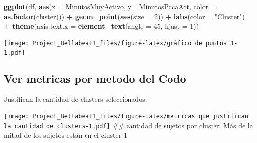 \documentclass[
]{article}
\newenvironment{Shaded}{\begin{snugshade}}{\end{snugshade}}
\newcommand{\AttributeTok}[1]{\textcolor[rgb]{0.13,0.29,0.53}{#1}}
\newcommand{\CommentTok}[1]{\textcolor[rgb]{0.56,0.35,0.01}{\textit{#1}}}
\newcommand{\DecValTok}[1]{\textcolor[rgb]{0.00,0.00,0.81}{#1}}
\newcommand{\FunctionTok}[1]{\textcolor[rgb]{0.13,0.29,0.53}{\textbf{#1}}}
\newcommand{\NormalTok}[1]{#1}
\newcommand{\OtherTok}[1]{\textcolor[rgb]{0.56,0.35,0.01}{#1}}
\newcommand{\SpecialCharTok}[1]{\textcolor[rgb]{0.81,0.36,0.00}{\textbf{#1}}}
\newcommand{\StringTok}[1]{\textcolor[rgb]{0.31,0.60,0.02}{#1}}
\begin{document}
\begin{Shaded}
\begin{Highlighting}[]
\FunctionTok{ggplot}\NormalTok{(df, }\FunctionTok{aes}\NormalTok{(}\AttributeTok{x =}\NormalTok{ MinutosMuyActivo, }\AttributeTok{y=}\NormalTok{ MinutosPocaAct, }\AttributeTok{color =} \FunctionTok{as.factor}\NormalTok{(cluster))) }\SpecialCharTok{+}
  \FunctionTok{geom\_point}\NormalTok{(}\FunctionTok{aes}\NormalTok{(}\AttributeTok{size =} \DecValTok{2}\NormalTok{)) }\SpecialCharTok{+}
  \FunctionTok{labs}\NormalTok{(}\AttributeTok{color =} \StringTok{"Cluster"}\NormalTok{) }\SpecialCharTok{+} \FunctionTok{theme}\NormalTok{(}\AttributeTok{axis.text.x =} \FunctionTok{element\_text}\NormalTok{(}\AttributeTok{angle =} \DecValTok{45}\NormalTok{, }\AttributeTok{hjust =} \DecValTok{1}\NormalTok{))}
\end{Highlighting}
\end{Shaded}

\texttt{[image: Project\_Bellabeat1\_files/figure-latex/gráfico de puntos 1-1.pdf]}

\subsection{Ver metricas por metodo del
Codo}\label{ver-metricas-por-metodo-del-codo}

Justifican la cantidad de clusters seleccionados.

\begin{Shaded}
\end{Shaded}

\texttt{[image: Project\_Bellabeat1\_files/figure-latex/metricas que justifican la cantidad de clusters-1.pdf]}
\#\# cantidad de sujetos por cluster: Más de la mitad de los sujetos
están en el cluster 1.
\end{document}
